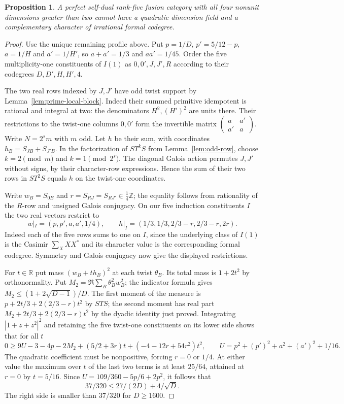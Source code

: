 \documentclass[11pt,a4paper]{article}
\newtheorem{proposition}[theorem]{Proposition}
\numberwithin{equation}{section}
\begin{document}
\begin{proposition}\label{prop:mixed-polar}
A perfect self-dual rank-five fusion category with all four nonunit
dimensions greater than two cannot have a quadratic dimension field
and a complementary character of irrational formal codegree.
\end{proposition}
\begin{proof}
Use the unique remaining profile above. Put $p=1/D$, $p'=5/12-p$,
$a=1/H$ and $a'=1/H'$, so $a+a'=1/3$ and $aa'=1/45$.
Order the five multiplicity-one constituents of $I(1)$ as
$0,0',J,J',R$ according to their codegrees $D,D',H,H',4$.

The two real rows indexed by $J,J'$ have odd twist support by
Lemma~\ref{lem:prime-local-block}. Indeed their summed primitive
idempotent is rational and integral at two: the denominators
$H^2,(H')^2$ are units there. Their restrictions to the twist-one
columns $0,0'$ form the invertible matrix
$\left(\begin{smallmatrix}a&a'\\a'&a\end{smallmatrix}\right)$.
Write $N=2^s m$ with $m$ odd.
Let $h$ be their sum, with coordinates $h_B=S_{JB}+S_{J'B}$.
In the factorization of $ST^kS$ from Lemma~\ref{lem:odd-row}, choose
$k=2\pmod m$ and $k=1\pmod{2^s}$. The diagonal Galois action
permutes $J,J'$ without signs, by their character-row expressions.
Hence the sum of their two rows in $ST^2S$ equals $h$ on the
twist-one coordinates.

Write $w_B=S_{0B}$ and $r=S_{RJ}=S_{RJ'}\in\tfrac14\mathbb Z$;
the equality follows from rationality of the $R$-row and unsigned
Galois conjugacy. On our five induction constituents $I$ the two
real vectors restrict to
\[
 w|_I=(p,p',a,a',1/4),\qquad
 h|_I=(1/3,1/3,2/3-r,2/3-r,2r).
\]
Indeed each of the five rows sums to one on $I$, since the underlying
class of $I(1)$ is the Casimir $\sum_X XX^*$ and its character value is
the corresponding formal codegree. Symmetry and Galois conjugacy now
give the displayed restrictions.

For $t\in\mathbb R$ put mass $(w_B+t h_B)^2$ at each twist
$\theta_B$. Its total mass is $1+2t^2$ by orthonormality. Put
$M_2=\Re\sum_B \theta_B^2 w_B^2$; the indicator formula gives
$M_2\le (1+2\sqrt{D-1})/D$.
The first moment of the measure is
$p+2t/3+2(2/3-r)t^2$ by $STS$; the second moment has real part
$M_2+2t/3+2(2/3-r)t^2$ by the dyadic identity just proved.
Integrating $|1+z+z^2|^2$ and retaining the five twist-one
constituents on its lower side shows that for all $t$
\[
 0\ge 9U-3-4p-2M_2
 +(5/2+3r)t+(-4-12r+54r^2)t^2,
 \qquad U=p^2+(p')^2+a^2+(a')^2+1/16 .
\]
The quadratic coefficient must be nonpositive, forcing $r=0$ or
$1/4$. At either value the maximum over $t$ of the last two terms
is at least $25/64$, attained at $r=0$ by $t=5/16$.
Since $U=109/360-5p/6+2p^2$, it follows that
\[
 37/320\le 27/(2D)+4/\sqrt D.
\]
The right side is smaller than $37/320$ for $D\ge1600$.


\end{proof}
\end{document}
